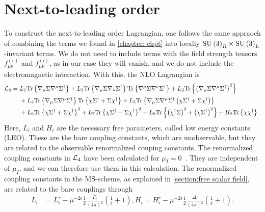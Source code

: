 \section{Next-to-leading order}
\label{section: nlo chpt}


To construct the next-to-leading order Lagrangian, one follows the same appraoch of combining the terms we found in \autoref{chapter: chpt} into locally $\text{SU}\left(3\right)_R\times\text{SU}\left(3\right)_L$-invariant terms.
We do not need to include terms with the field strength tensors $f_{\mu\nu}^{(r)}$ and $f_{\mu\nu}^{(l)}$, as in our case they will vanish, and we do not include the electromagnetic interaction.
With this, the NLO Lagrangian is~\autocite{gasserChiralPerturbationTheory1985}
%
\begin{align}
    \label{NLO Lagrangian three flavor}
    \nonumber
    \mathcal{L}_4 
    ={} &
    L_1\text{Tr} \left\{ \nabla_\mu \Sigma \nabla^\mu \Sigma^\dagger \right\}
    + L_2 \text{Tr} \left\{ \nabla_\mu \Sigma \nabla_\nu \Sigma^\dagger \right\} 
    \text{Tr} \left\{ \nabla^\mu \Sigma \nabla^\nu \Sigma^\dagger \right\}
    + L_3 \text{Tr} \left\{ \left(\nabla_\mu \Sigma \nabla^\mu \Sigma^\dagger\right)^2 \right\} \\ \nonumber
    & + L_4 \text{Tr} \left\{ \nabla_\mu \Sigma \nabla^\mu \Sigma^\dagger \right\} 
    \text{Tr} \left\{ \chi \Sigma^\dagger + \Sigma \chi^\dagger \right\}
    + L_5 \text{Tr} \left\{ 
        \nabla_\mu \Sigma \nabla^\mu \Sigma^\dagger 
        \left(\chi \Sigma^\dagger + \Sigma \chi^\dagger\right)
     \right\}\\
    &+ L_6 \text{Tr} \left\{ \chi \Sigma^\dagger + \Sigma \chi^\dagger \right\}^2 
     + L_7 \text{Tr} \left\{ \chi \Sigma^\dagger - \Sigma \chi^\dagger \right\}^2
    + L_8 \text{Tr} \left\{  \left(\chi^\dagger \Sigma \right)^2 + \left(\chi \Sigma^\dagger \right)^2 \right\}
    + H_2 \text{Tr} \left\{ \chi \chi^\dagger \right\}.
\end{align}
%
Here, $L_i$ and $H_i$ are the necessary free parameters, called low energy constants (LEO).
These are the bare coupling constants, which are unobservable, but they are related to the observable renormalized couping constants.
The renormalized coupling constants in $\mathcal{L}_4$ have been calculated for $\mu_I = 0$~\autocite{gasserChiralPerturbationTheory1985}.
They are independent of $\mu_I$, and we can therefore use them in this calculation.
The renormalized coupling constants in the $\overline{\mathrm{MS}}$-scheme, as explained in \autoref{section:free scalar field}, are related to the bare couplings through
\begin{align}
    L_i 
    & = 
    L_i^r 
    - \mu^{-2\epsilon}\frac{1}{2} \frac{\Gamma_i}{(4 \pi)^2} 
    \left(\frac{1}{\epsilon} + 1 \right),
    H_i = 
    H_i^r
    - \mu^{-2\epsilon} \frac{1}{2}  \frac{\Delta_i }{(4 \pi)^2} 
    \left(\frac{1}{\epsilon} + 1 \right).
\end{align}

